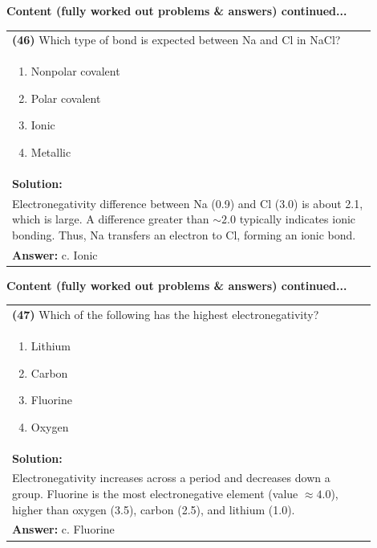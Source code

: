 \documentclass{article}
\begin{document}
{\newpage

\noindent
{\large\textbf{Content (fully worked out problems \& answers) continued...}}\\[0.2em]
\vspace{0.2cm}
\begin{tabular}{|p{0.9\linewidth}|}
\hline
\vspace{0.2cm}
\textbf{(46)} Which type of bond is expected between Na and Cl in NaCl? \\
\begin{minipage}[t]{0.85\linewidth}
\begin{enumerate}[label=\alph*.]
\item Nonpolar covalent \
\item Polar covalent \
\item Ionic \
\item Metallic
\end{enumerate}
\end{minipage}\\
\hline
\vspace{0.2cm}
\textbf{Solution:} \\
Electronegativity difference between Na (0.9) and Cl (3.0) is about 2.1, which is large. A difference greater than $\sim 2.0$ typically indicates ionic bonding. Thus, Na transfers an electron to Cl, forming an ionic bond. \\
\hline
\vspace{0.2cm}
\textbf{Answer:} c. Ionic \\
\hline
\end{tabular}
\newpage

\noindent
{\large\textbf{Content (fully worked out problems \& answers) continued...}}\\[0.2em]
\vspace{0.2cm}
\begin{tabular}{|p{0.9\linewidth}|}
\hline
\vspace{0.2cm}
\textbf{(47)} Which of the following has the highest electronegativity? \\
\begin{minipage}[t]{0.85\linewidth}
\begin{enumerate}[label=\alph*.]
\item Lithium \
\item Carbon \
\item Fluorine \
\item Oxygen
\end{enumerate}
\end{minipage}\\
\hline
\vspace{0.2cm}
\textbf{Solution:} \\
Electronegativity increases across a period and decreases down a group. Fluorine is the most electronegative element (value $\approx 4.0$), higher than oxygen (3.5), carbon (2.5), and lithium (1.0). \\
\hline
\vspace{0.2cm}
\textbf{Answer:} c. Fluorine \\
\hline
\end{tabular}
\newpage

}
\end{document}
